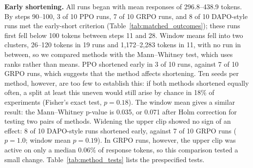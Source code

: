 \documentclass[ai,article,submit,oneauthor]{Definitions/mdpi}
\begin{document}
\noindent\textbf{Early shortening.}
All runs began with mean responses of 296.8--438.9 tokens. By steps 90--100, 3 of 10 PPO runs, 7 of 10 GRPO runs, and 8 of 10 DAPO-style runs met the early-short criterion (Table~\ref{tab:matched_outcomes}); these runs first fell below 100 tokens between steps 11 and 28. Window means fell into two clusters, 26--120 tokens in 19 runs and 1,172--2,283 tokens in 11, with no run in between, so we compared methods with the Mann--Whitney test, which uses ranks rather than means. PPO shortened early in 3 of 10 runs, against 7 of 10 GRPO runs, which suggests that the method affects shortening. Ten seeds per method, however, are too few to establish this: if both methods shortened equally often, a split at least this uneven would still arise by chance in 18\% of experiments (Fisher's exact test, $p=0.18$). The window mean gives a similar result: the Mann--Whitney p-value is 0.035, or 0.071 after Holm correction for testing two pairs of methods. Widening the upper clip showed no sign of an effect: 8 of 10 DAPO-style runs shortened early, against 7 of 10 GRPO runs ($p=1.0$; window mean $p=0.19$). In GRPO runs, however, the upper clip was active on only a median 0.06\% of response tokens, so this comparison tested a small change. Table~\ref{tab:method_tests} lists the prespecified tests.

\begin{table}[H]
\centering
\caption{Training outcomes by method (ten runs each). Early short: mean response length over steps 90--100 at most 100 tokens, with exact 95\% Clopper--Pearson intervals (\%). Window tokens: median (range) of that mean. Entropy explosion: step-300 per-token entropy above 1 nat. Countdown: step-300 validation accuracy, median (range). Every run appears in Table~\ref{tab:all_b_runs}.}
\label{tab:matched_outcomes}
\end{table}
\end{document}
